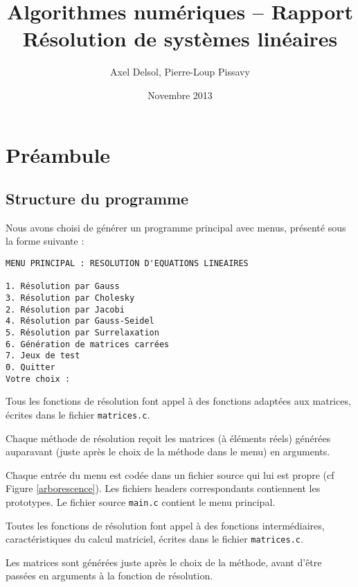 \documentclass{report}
\title{Algorithmes numériques -- Rapport \\ \vspace{0.5cm}Résolution de systèmes linéaires}
\author{Axel Delsol, Pierre-Loup Pissavy}
\date{Novembre 2013}
\begin{document}
  \maketitle
  \tableofcontents

  \chapter{Préambule}
  	\section{Structure du programme}
    Nous avons choisi de générer un programme principal avec menus, présenté sous la forme suivante :

    \begin{lstlisting}[style=apercu, name=Menu Principal]
MENU PRINCIPAL : RESOLUTION D'EQUATIONS LINEAIRES

1. Résolution par Gauss
3. Résolution par Cholesky
2. Résolution par Jacobi
4. Résolution par Gauss-Seidel
5. Résolution par Surrelaxation
6. Génération de matrices carrées
7. Jeux de test
0. Quitter
Votre choix : 
	\end{lstlisting}
	
	Tous les fonctions de résolution font appel à des fonctions adaptées aux matrices, écrites dans le fichier \verb"matrices.c".
    \vspace{0.3cm}
    
    Chaque méthode de résolution reçoit les matrices (à éléments réels) générées auparavant (juste après le choix de la méthode dans le menu) en arguments.
    \vspace{0.3cm}
    	
	Chaque entrée du menu est codée dans un fichier source qui lui est propre (cf Figure \ref{arborescence}). Les fichiers headers correspondants contiennent les prototypes. Le fichier source \verb"main.c" contient le menu principal.
	\vspace{0.3cm}
	
	Toutes les fonctions de résolution font appel à des fonctions intermédiaires, caractéristiques du calcul matriciel, écrites dans le fichier \verb"matrices.c".
	\vspace{0.3cm}
	
    
    \vspace{0.3cm}

    Les matrices sont générées juste après le choix de la méthode, avant d'être passées en arguments à la fonction de résolution.
\end{document}
